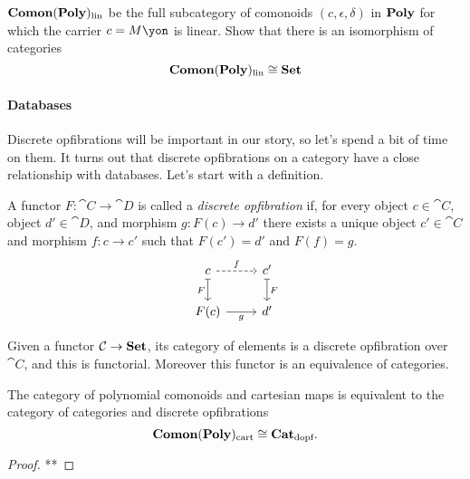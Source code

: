 \documentclass[DynamicalBook]{subfiles}
\begin{document}
\begin{exercise}
$\textbf{Comon}(\textbf{Poly})_{\text{lin}}$ be the full subcategory of comonoids $(c,\epsilon,\delta)$ in $\textbf{Poly}$ for which the carrier $c=M\yon$ is linear. Show that there is an isomorphism of categories
\[
\textbf{Comon}(\textbf{Poly})_{\text{lin}}\cong\textbf{Set}
\]
\end{exercise}

\paragraph{Databases}

Discrete opfibrations will be important in our story, so let's spend a bit of time on them. It turns out that discrete opfibrations on a category have a close relationship with databases. Let's start with a definition.


\begin{definition}
A functor $F\colon\cat{C}\to\cat{D}$ is called a \emph{discrete opfibration} if, for every object $c\in\cat{C}$, object $d'\in\cat{D}$, and morphism $g\colon F(c)\to d'$ there exists a unique object $c'\in\cat{C}$ and morphism $f\colon c\to c'$ such that $F(c')=d'$ and $F(f)=g$.
\[
\begin{tikzcd}
  c\ar[r, dashed, "f"]\ar[d, |->, "F"']&
  c'\ar[d, |->, "F"]\\
  F(c)\ar[r, "g"']&
  d'
\end{tikzcd}
\]
\end{definition}


\begin{proposition}\label{prop.dopf_copresheaf}
Given a functor $\mathcal{C}\to\textbf{Set}$, its category of elements is a discrete opfibration over $\cat{C}$, and this is functorial. Moreover this functor is an equivalence of categories.
\end{proposition}


\begin{example}[Database]
\end{example}



\begin{proposition}\label{prop.cart_com_dopf}
The category of polynomial comonoids and cartesian maps is equivalent to the category of categories and discrete opfibrations
\[
\textbf{Comon}(\textbf{Poly})_{\text{cart}}\cong \textbf{Cat}_{\text{dopf}}.
\]
\end{proposition}
\begin{proof}
**
\end{proof}
\end{document}
